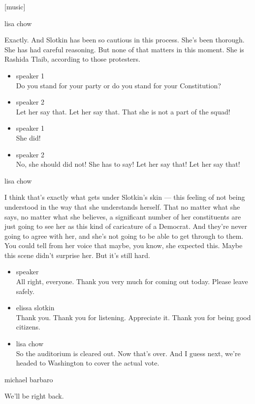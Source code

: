 {[}music{]}

lisa chow

Exactly. And Slotkin has been so cautious in this process. She's been
thorough. She has had careful reasoning. But none of that matters in
this moment. She is Rashida Tlaib, according to those protesters.

\begin{itemize}
\item
  speaker 1\\
  Do you stand for your party or do you stand for your Constitution?
\item
  speaker 2\\
  Let her say that. Let her say that. That she is not a part of the
  squad!
\item
  speaker 1\\
  She did!
\item
  speaker 2\\
  No, she should did not! She has to say! Let her say that! Let her say
  that!
\end{itemize}

lisa chow

I think that's exactly what gets under Slotkin's skin --- this feeling
of not being understood in the way that she understands herself. That no
matter what she says, no matter what she believes, a significant number
of her constituents are just going to see her as this kind of caricature
of a Democrat. And they're never going to agree with her, and she's not
going to be able to get through to them. You could tell from her voice
that maybe, you know, she expected this. Maybe this scene didn't
surprise her. But it's still hard.

\begin{itemize}
\item
  speaker\\
  All right, everyone. Thank you very much for coming out today. Please
  leave safely.
\item
  elissa slotkin\\
  Thank you. Thank you for listening. Appreciate it. Thank you for being
  good citizens.
\item
  lisa chow\\
  So the auditorium is cleared out. Now that's over. And I guess next,
  we're headed to Washington to cover the actual vote.
\end{itemize}

michael barbaro

We'll be right back.


